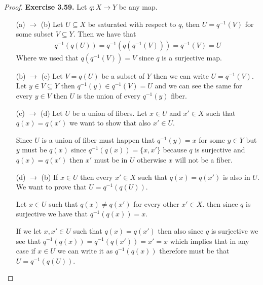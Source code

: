 \documentclass[11pt]{article}
\theoremstyle{definition}
\begin{document}
\begin{proof}{\textbf{Exercise 3.59.}}
    Let $q: X \to Y$ be any map.
    \begin{itemize}
        \item [(a) $\to$ (b)] Let $U \subseteq X$ be saturated with respect
        to $q$, then $U = q^{-1}(V)$ for some subset $V \subseteq Y$.
        Then we have that
        \begin{align*}
            q^{-1}(q(U)) = q^{-1}(q(q^{-1}(V))) = q^{-1}(V) = U
        \end{align*}
        Where we used that $q(q^{-1}(V)) = V$ since $q$ is a surjective map.

        \item [(b) $\to$ (c)] Let $V = q(U)$ be a subset of $Y$ then we can
        write $U = q^{-1}(V)$. Let $y \in V \subseteq Y$ then
        $q^{-1}(y) \in q^{-1}(V) = U$ and we can see the same for every
        $y \in V$ then $U$ is the union of every $q^{-1}(y)$ fiber.

        \item [(c) $\to$ (d)] Let $U$ be a union of fibers.
        Let $x \in U$ and $x' \in X$ such that $q(x) = q(x')$ we want to show
        that also $x' \in U$.
        
        Since $U$ is a union of fiber must happen that $q^{-1}(y) = x$ for some
        $y \in Y$ but $y$ must be $q(x)$ since $q^{-1}(q(x)) = \{x,x'\}$ because
        $q$ is surjective and $q(x) = q(x')$ then $x'$ must be in $U$
        otherwise $x$ will not be a fiber.

        \item [(d) $\to$ (b)] If $x \in U$ then every $x' \in X$ such that
        $q(x) = q(x')$ is also in $U$. We want to prove that $U = q^{-1}(q(U))$.
        
        Let $x \in U$ such that $q(x) \neq q(x')$ for every other $x' \in X$.
        then since $q$ is surjective we have that $q^{-1}(q(x)) = x$.

        If we let $x,x' \in U$ such that $q(x) = q(x')$ then also since $q$
        is surjective we see that $q^{-1}(q(x)) = q^{-1}(q(x')) = x' = x$
        which implies that in any case if $x \in U$ we can write it as
        $q^{-1}(q(x))$ therefore must be that $U = q^{-1}(q(U))$.
    \end{itemize}
\end{proof}
\cleardoublepage
\end{document}

